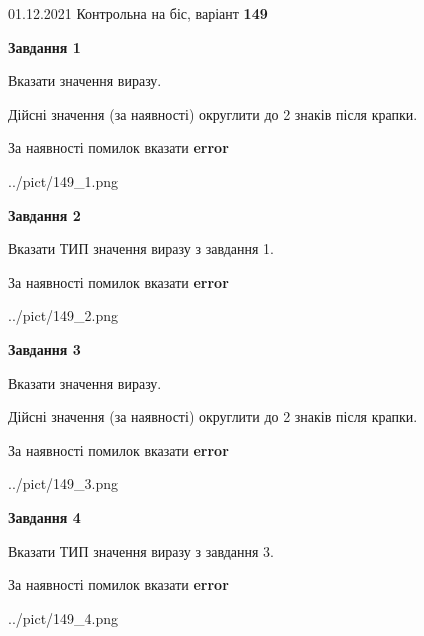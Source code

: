 \documentclass[11pt, ukrainian]{article}
\begin{document}
{01.12.2021 Контрольна на біс, варіант  \No \textbf { 149 }\par}
{
\begin {large}
{\begin {center}\textbf{Завдання 1}\end {center}}\par
Вказати значення виразу. \par
Дійсні значення (за наявності) округлити до 2 знаків після крапки. \par
За наявності помилок вказати \textbf{error}

\begin{center}
	{../pict/149_1.png}
\end{center}
\newpage

{\begin {center}\textbf{Завдання 2}\end {center}}\par
Вказати ТИП значення виразу з завдання 1. \par
За наявності помилок вказати \textbf{error}

\begin{center}
	{../pict/149_2.png}
\end{center}
\newpage

{\begin {center}\textbf{Завдання 3}\end {center}}\par
Вказати значення виразу. \par
Дійсні значення (за наявності) округлити до 2 знаків після крапки. \par
За наявності помилок вказати \textbf{error}

\begin{center}
	{../pict/149_3.png}
\end{center}
\newpage

{\begin {center}\textbf{Завдання 4}\end {center}}\par
Вказати ТИП значення виразу з завдання 3. \par
За наявності помилок вказати \textbf{error}

\begin{center}
	{../pict/149_4.png}
\end{center}
\newpage


\end{large}}
\end{document}

